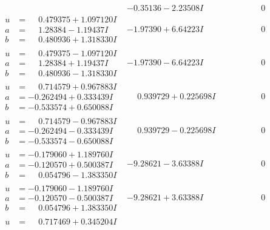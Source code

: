 \documentclass[1p]{elsarticle_modified}
\theoremstyle{definition}
\begin{document}
$$\begin{array}{c|c|c}
 & -0.35136 - 2.23508 I & \phantom{-0.000000 } 0 \\ \hline\begin{aligned}
u &= \phantom{-}0.479375 + 1.097120 I \\
a &= \phantom{-}1.28384 - 1.19437 I \\
b &= \phantom{-}0.480936 + 1.318330 I\end{aligned}
 & -1.97390 + 6.64223 I & \phantom{-0.000000 } 0 \\ \hline\begin{aligned}
u &= \phantom{-}0.479375 - 1.097120 I \\
a &= \phantom{-}1.28384 + 1.19437 I \\
b &= \phantom{-}0.480936 - 1.318330 I\end{aligned}
 & -1.97390 - 6.64223 I & \phantom{-0.000000 } 0 \\ \hline\begin{aligned}
u &= \phantom{-}0.714579 + 0.967883 I \\
a &= -0.262494 + 0.333439 I \\
b &= -0.533574 + 0.650088 I\end{aligned}
 & \phantom{-}0.939729 + 0.225698 I & \phantom{-0.000000 } 0 \\ \hline\begin{aligned}
u &= \phantom{-}0.714579 - 0.967883 I \\
a &= -0.262494 - 0.333439 I \\
b &= -0.533574 - 0.650088 I\end{aligned}
 & \phantom{-}0.939729 - 0.225698 I & \phantom{-0.000000 } 0 \\ \hline\begin{aligned}
u &= -0.179060 + 1.189760 I \\
a &= -0.120570 + 0.500387 I \\
b &= \phantom{-}0.054796 - 1.383350 I\end{aligned}
 & -9.28621 - 3.63388 I & \phantom{-0.000000 } 0 \\ \hline\begin{aligned}
u &= -0.179060 - 1.189760 I \\
a &= -0.120570 - 0.500387 I \\
b &= \phantom{-}0.054796 + 1.383350 I\end{aligned}
 & -9.28621 + 3.63388 I & \phantom{-0.000000 } 0 \\ \hline\begin{aligned}
u &= \phantom{-}0.717469 + 0.345204 I \\

\end{aligned}
\end{array}$$
\end{document}
